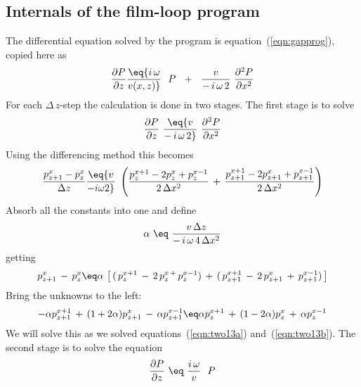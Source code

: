 \subsection{Internals of the film-loop program}
\par
The differential equation solved by the program is
equation~(\ref{eqn:gapprog}), copied here as
\begin{equation}
{\partial P   \over  \partial z }  \eq 
{ i \, \omega     \over v(x,z)} \  \  P
\ \ +\ \  {v \over  - \, i \, \omega \, 2 } \ 
{\partial^2 P   \over \partial x^2}
\label{eqn:three1}
\end{equation}
For each $\Delta\,z$-step the calculation is done in two stages.
The first stage is to solve
\begin{equation}
{\partial P  \over \partial z} \  \eq 
{v \over - \, i \, \omega \, 2} \   {\partial^2 P  \over \partial x^2} 
\label{eqn:three2}
\end{equation}
Using the 
differencing method this becomes
\begin{equation}
{ p_{{z+1}}^x - p_z^x   \over  \Delta z }
\eq
{v  \over  -i\omega2} \ 
\left( { p_z^{{x+1}} - 
2  p_z^x + 
p_z^{{x-1}}   \over 2\, \Delta x^2 }\,+\,
{  p_{{z+1}}^{{x+1}}- 
2  p_{{z+1}}^x  + 
p_{{z+1}}^{{x-1}}   \over 2\, \Delta x^2 }  \right)
\end{equation}
Absorb all the constants into one and define
\begin{equation}
\alpha \  \eq \  {v \, \Delta z  \over -\,i\,\omega\,4\, \Delta x^2 }
\label{eqn:three3}
\end{equation}
getting
\begin{equation}
p_{{z+1}}^x \,-\, p_z^x
\eq
\alpha \, \left[
\, ( \, p_z^{{x+1}}\,-\, 2 \, p_z^{x\,+\,} p_z^{{x-1}} )
\,+\,
( \, p_{{z+1}}^{{x+1}}\,-\, 2 \, p_{{z+1}}^x \,+\, p_{{z+1}}^{{x-1}} )
\, \right]
\end{equation}
Bring the unknowns to the left:
\begin{equation}
- \alpha  p_{{z+1}}^{{x+1}} \,+\,
( 1+2 \alpha )  p_{{z+1}}^x \,-\,
 \alpha  p_{{z+1}}^{{x-1}}
\eq
 \alpha  p_z^{{x+1}} \,+\,
(1-2 \alpha )   p_z^x \,+\,
 \alpha  p_z^{{x-1}}
\label{eqn:three4}
\end{equation}
We will solve this as we solved
equations~(\ref{eqn:two13a}) and~(\ref{eqn:two13b}).
The second stage is to solve the equation
\begin{equation}
{\partial P  \over \partial z} \  \eq \  {i\,\omega  \over v }\ \  P
\label{eqn:three5}
\end{equation}
